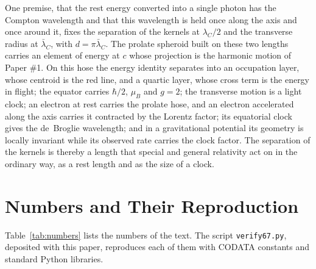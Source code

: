 \documentclass[%
 reprint, amsmath,amssymb, aps, prb, ]{revtex4-2}
\numberwithin{equation}{section}
\newcommand{\lamC}{\lambda_C}
\newcommand{\lbar}{\bar{\lambda}_C}
\begin{document}
One premise, that the rest energy converted into a single photon has the Compton wavelength and that this wavelength is held once along the axis and once around it, fixes the separation of the kernels at $\lamC/2$ and the transverse radius at $\lbar$, with $d = \pi\lbar$. The prolate spheroid built on these two lengths carries an element of energy at $c$ whose projection is the harmonic motion of Paper \#1. On this hose the energy identity separates into an occupation layer, whose centroid is the red line, and a quartic layer, whose cross term is the energy in flight; the equator carries $\hbar/2$, $\mu_B$ and $g = 2$; the transverse motion is a light clock; an electron at rest carries the prolate hose, and an electron accelerated along the axis carries it contracted by the Lorentz factor; its equatorial clock gives the de~Broglie wavelength; and in a gravitational potential its geometry is locally invariant while its observed rate carries the clock factor. The separation of the kernels is thereby a length that special and general relativity act on in the ordinary way, as a rest length and as the size of a clock.

\appendix

\section{Numbers and Their Reproduction}
\label{app:numbers}

Table~\ref{tab:numbers} lists the numbers of the text. The script \texttt{verify67.py}, deposited with this paper, reproduces each of them with CODATA constants and standard Python libraries.
\end{document}
